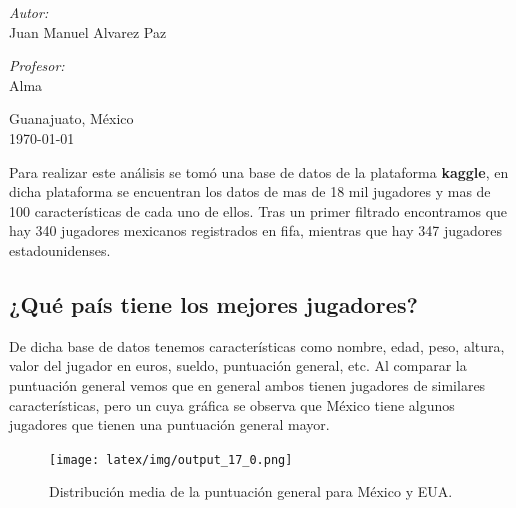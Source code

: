 \documentclass[10pt]{article}
\begin{document}
\begin{center}
\begin{minipage}{0.46\textwidth}
\begin{flushleft}
\emph{Autor:}\\	
Juan Manuel Alvarez Paz\\

\end{flushleft}																		%
\end{minipage}		
\begin{minipage}{0.52\textwidth}		
\vspace{-0.6cm}											%
\begin{flushright} \large															%
\emph{Profesor:} \\																	%
	Alma\\
\end{flushright}																	%
\end{minipage}	
\vspace*{1cm}
 	
\vspace{1cm} 



\vspace{2cm} 

\begin{center}	
Guanajuato, México \\
{\large \today}																	%
 			\end{center}												  						
\end{center}							 							
\newpage
Para realizar este análisis se tomó una base de datos de la plataforma \textbf{kaggle}, en dicha plataforma se encuentran los datos de mas de 18 mil jugadores y mas de 100 características de cada uno de ellos. \newline
Tras un primer filtrado encontramos que hay 340 jugadores mexicanos registrados en fifa, mientras que hay 347 jugadores estadounidenses.\cite{1}

\begin{center}
    \section*{\textbf{¿Qué país tiene los mejores jugadores?}}
\end{center}
De dicha base de datos tenemos características como nombre, edad, peso, altura, valor del jugador en euros, sueldo, puntuación general, etc. Al comparar la puntuación general vemos que en general ambos tienen jugadores de similares características, pero un cuya gráfica se observa que México tiene algunos jugadores que tienen una puntuación general mayor. 
\begin{figure}[H]
    \centering
    \texttt{[image: latex/img/output\_17\_0.png]}
    \caption{Distribución media de la puntuación general para México y EUA.}
    \label{fig:my_label}
\end{figure}
\end{document}
